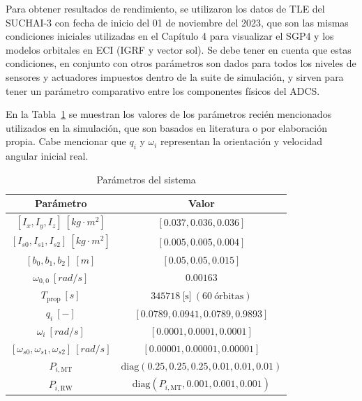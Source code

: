 Para obtener resultados de rendimiento, se utilizaron los datos de TLE del SUCHAI-3 con fecha de inicio del 01 de noviembre del 2023, que son las mismas condiciones iniciales utilizadas en el Capítulo 4 para visualizar el SGP4 y los modelos orbitales en ECI (IGRF y vector sol). Se debe tener en cuenta que estas condiciones, en conjunto con otros parámetros son dados para todos los niveles de sensores y actuadores impuestos dentro de la suite de simulación, y sirven para tener un parámetro comparativo entre los componentes físicos del \gls{ADCS}.

En la Tabla~\ref{tab:parametros} se muestran los valores de los parámetros recién mencionados utilizados en la simulación, que son basados en literatura \cite{ref14,ref41,ref44} o por elaboración propia. Cabe mencionar que $q_i$ y $\omega_i$ representan la orientación y velocidad angular inicial real.

\begin{table}[h!]
	\centering
	\caption{Parámetros del sistema}
	\begin{tabular}{|c|c|}
		\hline
		\textbf{Parámetro} & \textbf{Valor} \\
		\hline
		$[I_x, I_y, I_z] \ [kg \cdot m^2]$ & $[0.037, 0.036, 0.036]$ \\
		\hline		
		$[I_{s0}, I_{s1}, I_{s2}] \ [kg \cdot m^2]$ & $[0.005, 0.005, 0.004]$ \\
		\hline
		$[b_0, b_1, b_2] \ [m]$ & $[0.05, 0.05, 0.015]$ \\
		\hline		
		$\omega_{0,0} \ [rad/s]$ & $0.00163$ \\
		\hline
		$T_{\text{prop}} \ [s]$ & $345718 \ \text{[s]} \ (60 \ \text{órbitas})$ \\
		\hline
		$q_i \ [-]$ & $\left[ 0.0789, 0.0941, 0.0789, 0.9893 \right]$ \\
		\hline
		$\omega_i \ [rad/s]$ & $[0.0001, 0.0001, 0.0001]$ \\
		\hline
		$[\omega_{s0}, \omega_{s1}, \omega_{s2}] \ [rad/s]$ & $[0.00001, 0.00001, 0.00001]$ \\
		\hline
		$P_{i, \text{MT}}$ & $\text{diag}(0.25, 0.25, 0.25, 0.01, 0.01, 0.01)$ \\
		\hline
		$P_{i, \text{RW}}$ & $\text{diag}(P_{i, \text{MT}}, 0.001, 0.001, 0.001)$ \\
		\hline
	\end{tabular}

	\label{tab:parametros}
\end{table}

